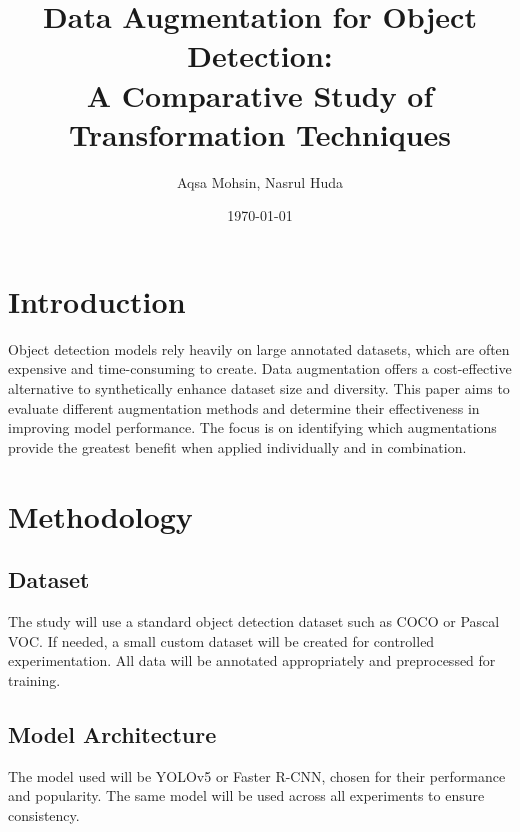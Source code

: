 \documentclass[12pt]{article}
\newcommand{\subtitle}[1]{%
  \posttitle{%
    \par\end{center}%
    \begin{center}\large#1\end{center}%
    \vskip0.5em}%
}
\begin{document}
  \title{Data Augmentation for Object Detection:\\A Comparative Study of Transformation Techniques}
  \subtitle{Paper Outline}
  \author{Aqsa Mohsin, Nasrul Huda}
  \date{\today}
  \maketitle


\section{Introduction}
Object detection models rely heavily on large annotated datasets, which are often expensive and time-consuming to create. Data augmentation offers a cost-effective alternative to synthetically enhance dataset size and diversity. This paper aims to evaluate different augmentation methods and determine their effectiveness in improving model performance. The focus is on identifying which augmentations provide the greatest benefit when applied individually and in combination.

\section{Methodology}
\subsection{Dataset}
The study will use a standard object detection dataset such as COCO or Pascal VOC. If needed, a small custom dataset will be created for controlled experimentation. All data will be annotated appropriately and preprocessed for training.

\subsection{Model Architecture}
The model used will be YOLOv5 or Faster R-CNN, chosen for their performance and popularity. The same model will be used across all experiments to ensure consistency.
\end{document}
